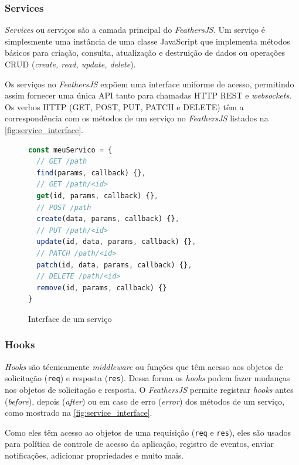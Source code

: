 \subsubsection{Services}

\textit{Services} ou serviços são a camada principal do \textit{\textit{FeathersJS}}.
Um serviço é simplesmente uma instância de uma classe JavaScript
que implementa métodos básicos para criação, consulta, atualização e
destruição de dados ou operações CRUD (\textit{create, read, update, delete}).

Os serviços no \textit{FeathersJS} expõem uma interface uniforme de acesso, permitindo
assim fornecer uma única API tanto para chamadas HTTP REST e \textit{websockets}.
Os verbos HTTP (GET, POST, PUT, PATCH e DELETE) têm a correspondência com
os métodos de um serviço no \textit{\textit{FeathersJS}} listados na \autoref{fig:service_interface}.

\begin{figure}[h]
\begin{lstlisting}[language=JavaScript]
const meuServico = {
  // GET /path
  find(params, callback) {},
  // GET /path/<id>
  get(id, params, callback) {},
  // POST /path
  create(data, params, callback) {},
  // PUT /path/<id>
  update(id, data, params, callback) {},
  // PATCH /path/<id>
  patch(id, data, params, callback) {},
  // DELETE /path/<id>
  remove(id, params, callback) {}
}
\end{lstlisting}
\caption{Interface de um serviço}
\label{fig:service_interface}
\end{figure}

\subsubsection{Hooks}

\textit{Hooks} são técnicamente \textit{middleware} ou funções que têm acesso aos
objetos de solicitação (\texttt{req}) e resposta (\texttt{res}).
Dessa forma os \textit{hooks} podem fazer mudanças nos objetos de solicitação e resposta.
O \textit{\textit{FeathersJS}} permite registrar \textit{hooks} antes (\textit{before}), depois
(\textit{after}) ou em caso de erro (\textit{error}) dos métodos de
um serviço, como mostrado na \autoref{fig:service_interface}.

Como eles têm acesso ao objetos de uma requisição (\texttt{req} e \texttt{res}), eles são usados
para política de controle de acesso da aplicação, registro de eventos, enviar
notificações, adicionar propriedades e muito mais.

